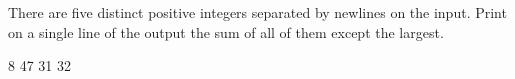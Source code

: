 




There are five distinct positive integers separated by newlines on the input. Print on a single line of the output the sum of all of them except the largest.

8
47
31
32
\koniec

